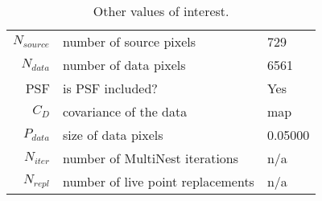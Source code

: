 \begin{table*}[!htb]\caption{Other values of interest.}\begin{center}\begin{tabular}{ r l l }\hline $N_{source}$ & number of source pixels           & 729 \\ 
 $N_{data}$   & number of data pixels             & 6561 \\ 
 PSF & is PSF included?                          & Yes \\
 $C_D$        & covariance of the data            & map \\ 
 $P_{data}$   & size of data pixels               &    0.05000 \\ 
 $N_{iter}$   & number of MultiNest iterations    & n/a \\ 
 $N_{repl}$   & number of live point replacements & n/a \\ 
\hline\end{tabular}\end{center}\label{tab:3}\end{table*}